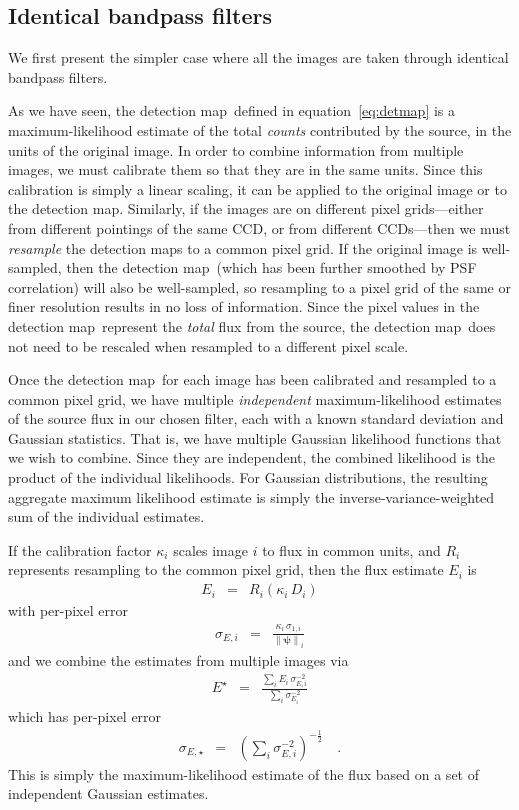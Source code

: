 \documentclass[letterpaper,preprint]{aastex62}
\newcommand{\equationname}{equation}
\newcommand{\eqnref}[1]{\mbox{\equationname~\ref{#1}}}
\newcommand{\detmap}{detection map}
\newcommand{\psf}{\psi}
\newcommand{\psfnorm}{\norm{\bm{\psf}}}
\newcommand{\norm}[1]{\left\lVert #1 \right\rVert}
\begin{document}
\subsection{Identical bandpass filters}

We first present the simpler case where all the images are taken
through identical bandpass filters.

As we have seen, the \detmap\ defined in \eqnref{eq:detmap} is a
maximum-likelihood estimate of the total \emph{counts} contributed by
the source, in the units of the original image.  In order to
combine information from multiple images, we must calibrate them so
that they are in the same units.  Since this calibration is simply a
linear scaling, it can be applied to the original image or to the
\detmap.  Similarly, if the images are on different pixel
grids---either from different pointings of the same CCD, or from
different CCDs---then we must \emph{resample} the \detmap s to a
common pixel grid.
%
If the original image is well-sampled, then the \detmap\ (which has
been further smoothed by PSF correlation) will also be well-sampled,
so resampling to a pixel grid of the same or finer resolution results
in no loss of information.
%
Since the pixel values in the \detmap\ represent the \emph{total} flux
from the source, the \detmap\ does not need to be rescaled when
resampled to a different pixel scale.



Once the \detmap\ for each image has been calibrated and resampled to
a common pixel grid, we have multiple \emph{independent}
maximum-likelihood estimates of the source flux in our chosen filter,
each with a known standard deviation and Gaussian statistics.  That
is, we have multiple Gaussian likelihood functions that we wish to
combine.  Since they are independent, the combined likelihood is the
product of the individual likelihoods.  For Gaussian distributions,
the resulting aggregate maximum likelihood estimate is simply the
inverse-variance-weighted sum of the individual estimates.

If the calibration factor $\kappa_i$ scales image $i$ to flux in
common units, and $R_i$ represents resampling to the common pixel grid,
then the flux estimate $E_i$ is
\begin{eqnarray}
E_i &=& R_i(\kappa_i \, D_i)
\end{eqnarray}
with per-pixel error
\begin{eqnarray}
\sigma_{E, i} &=& \frac{\kappa_i \, \sigma_{1,i}}{\psfnorm_i}
\end{eqnarray}
and we combine the estimates from multiple images via
\begin{eqnarray}
E^{\star} &=& \frac{\displaystyle\sum_i E_i \, \sigma^{-2}_{E,i}}{\displaystyle\sum_i \sigma^{-2}_{E_i}}
\label{eq:onebandmap}
\end{eqnarray}
which has per-pixel error
\begin{eqnarray}
\sigma_{E, \star} &=& \left( \sum_i \sigma^{-2}_{E,i} \right)^{-\frac{1}{2}}    \quad .
\end{eqnarray}
This is simply the maximum-likelihood estimate of the flux based on a
set of independent Gaussian estimates.
\end{document}
